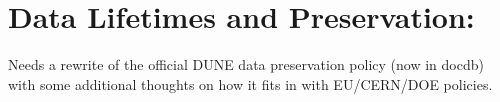 \documentclass[../main-v1.tex]{subfiles}
\begin{document}
\chapter{Data Lifetimes and Preservation: }
\label{ch:pres}


Needs a rewrite of the official DUNE data preservation policy (now in docdb) with some additional thoughts on how it fits in with EU/CERN/DOE policies. 
\end{document}
